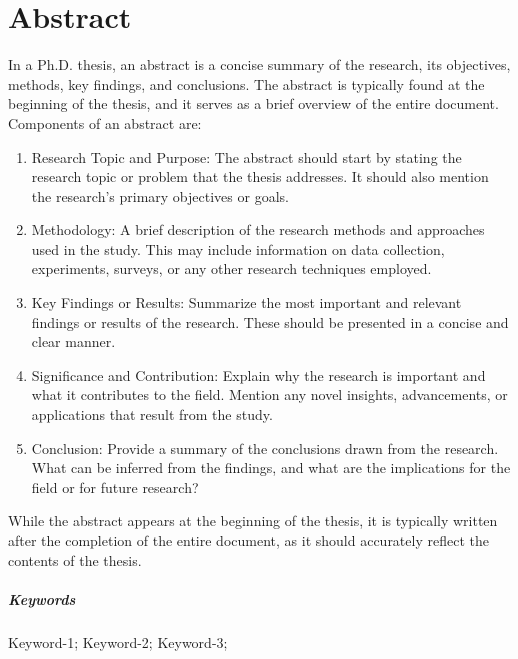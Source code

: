 
\begingroup
\let\clearpage\relax
\let\cleardoublepage\relax
\let\cleardoublepage\relax


\chapter*{Abstract} %
\medskip


In a Ph.D. thesis, an abstract is a concise summary of the research, its objectives, methods, key findings, and conclusions. The abstract is typically found at the beginning of the thesis, and it serves as a brief overview of the entire document. Components of an abstract are:

\begin{enumerate}


\item Research Topic and Purpose: The abstract should start by stating the research topic or problem that the thesis addresses. It should also mention the research's primary objectives or goals.

\item  Methodology: A brief description of the research methods and approaches used in the study. This may include information on data collection, experiments, surveys, or any other research techniques employed.

\item Key Findings or Results: Summarize the most important and relevant findings or results of the research. These should be presented in a concise and clear manner.

\item Significance and Contribution: Explain why the research is important and what it contributes to the field. Mention any novel insights, advancements, or applications that result from the study.

\item Conclusion: Provide a summary of the conclusions drawn from the research. What can be inferred from the findings, and what are the implications for the field or for future research?

\end{enumerate}

While the abstract appears at the beginning of the thesis, it is typically written after the completion of the entire document, as it should accurately reflect the contents of the thesis.


\paragraph{Keywords} Keyword-1; Keyword-2; Keyword-3;
\vfill
\endgroup	